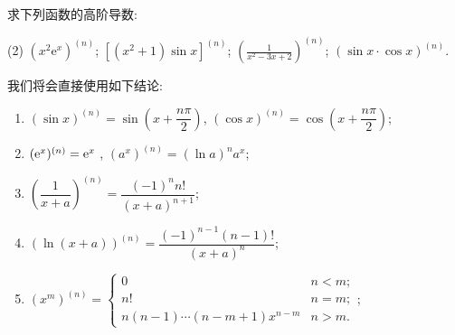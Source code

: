 \begin{exercise}[3.1.22]
    求下列函数的高阶导数:
    \begin{tasks}[label=(\arabic*)](2)
        \task $(x^2\mathrm{e}^x)^{(n)}$;
        \task $[(x^2+1)\sin x]^{(n)}$;
        \task $\left(\frac{1}{x^2-3x+2}\right)^{(n)}$;
        \task $(\sin x \cdot \cos x)^{(n)}$.
    \end{tasks}
\end{exercise}

我们将会直接使用如下结论:
\begin{enumerate}
    \item $(\sin x)^{(n)} = \sin(x + \dfrac{n\pi}2)$, $(\cos x)^{(n)} = \cos(x + \dfrac{n\pi}2)$;
    \item $(\mathrm{e}^x)^{(n)} = \mathrm{e}^x$ , $(a^x)^{(n)} = (\ln a)^n a^x$;
    \item $\left( \dfrac1{x+a}\right)^{(n)} = \dfrac{(-1)^n n!}{(x+a)^{n+1}}$;
    \item $\left( \ln(x+a)\right)^{(n)} = \dfrac{(-1)^{n-1}(n-1)!}{(x+a)^n}$;
    \item $(x^m)^{(n)} = \begin{cases}
                  0                          & n < m; \\
                  n!                         & n = m; \\
                  n(n-1)\cdots(n-m+1)x^{n-m} & n > m.
              \end{cases}$;
\end{enumerate}

